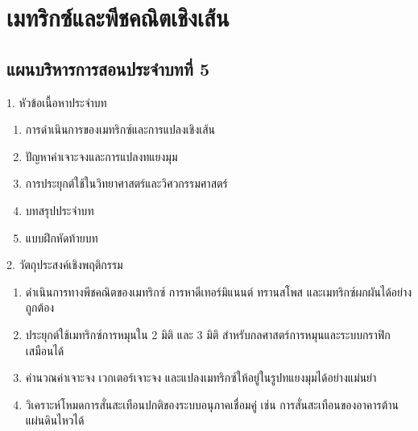 \chapter{เมทริกซ์และพีชคณิตเชิงเส้น}

\section*{แผนบริหารการสอนประจำบทที่ 5}

\begin{planbox}[colframe=rbruNavy, colbacktitle=rbruNavy]{1. หัวข้อเนื้อหาประจำบท}
\begin{enumerate}[topsep=2pt, itemsep=1pt, partopsep=0pt, parsep=0pt, leftmargin=1.5em]
    \item การดำเนินการของเมทริกซ์และการแปลงเชิงเส้น
    \item ปัญหาค่าเจาะจงและการแปลงทแยงมุม
    \item การประยุกต์ใช้ในวิทยาศาสตร์และวิศวกรรมศาสตร์
    \item บทสรุปประจำบท
    \item แบบฝึกหัดท้ายบท
\end{enumerate}
\end{planbox}

\begin{planbox}[colframe=rbruGreen, colbacktitle=rbruGreen]{2. วัตถุประสงค์เชิงพฤติกรรม}
\begin{enumerate}[topsep=2pt, itemsep=1pt, partopsep=0pt, parsep=0pt, leftmargin=1.5em]
    \item ดำเนินการทางพีชคณิตของเมทริกซ์ การหาดีเทอร์มิแนนต์ ทรานสโพส และเมทริกซ์ผกผันได้อย่างถูกต้อง
    \item ประยุกต์ใช้เมทริกซ์การหมุนใน 2 มิติ และ 3 มิติ สำหรับกลศาสตร์การหมุนและระบบกราฟิกเสมือนได้
    \item คำนวณค่าเจาะจง เวกเตอร์เจาะจง และแปลงเมทริกซ์ให้อยู่ในรูปทแยงมุมได้อย่างแม่นยำ
    \item วิเคราะห์โหมดการสั่นสะเทือนปกติของระบบอนุภาคเชื่อมคู่ เช่น การสั่นสะเทือนของอาคารต้านแผ่นดินไหวได้
\end{enumerate}
\end{planbox}

